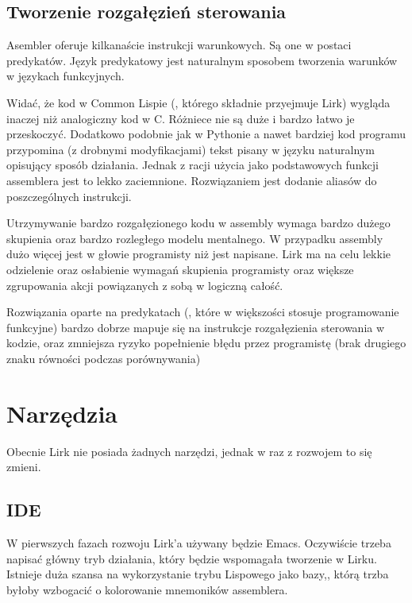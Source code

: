 \documentclass[11pt]{article}
\begin{document}
\subsection{Tworzenie rozgałęzień sterowania}
Asembler oferuje kilkanaście instrukcji warunkowych. Są one w postaci predykatów. Język predykatowy jest naturalnym sposobem tworzenia warunków w językach funkcyjnych. 

\begin{multicols}{3}

\columnbreak

\columnbreak

\end{multicols}

Widać, że kod w Common Lispie (, którego składnie przyejmuje Lirk) wygląda inaczej niż analogiczny kod w C. Różniece nie są duże i bardzo łatwo je przeskoczyć. Dodatkowo podobnie jak w Pythonie a nawet bardziej kod programu przypomina (z drobnymi modyfikacjami) tekst pisany w języku naturalnym opisujący sposób działania. Jednak z racji użycia jako podstawowych funkcji assemblera jest to lekko zaciemnione. Rozwiązaniem jest dodanie aliasów do poszczególnych instrukcji. 

Utrzymywanie bardzo rozgałęzionego kodu w assembly wymaga bardzo dużego skupienia oraz bardzo rozległego modelu mentalnego. W przypadku assembly dużo więcej jest w głowie programisty niż jest napisane.
Lirk ma na celu lekkie odzielenie oraz osłabienie wymagań skupienia programisty oraz większe zgrupowania akcji powiązanych z sobą w logiczną całość.

Rozwiązania oparte na predykatach (, które w większości stosuje programowanie funkcyjne) bardzo dobrze mapuje się na instrukcje rozgałęzienia sterowania w kodzie,
oraz zmniejsza ryzyko popełnienie błędu przez programistę (brak drugiego znaku równości podczas porównywania)

\section{Narzędzia}
Obecnie Lirk nie posiada żadnych narzędzi, jednak w raz z rozwojem to się zmieni.
\subsection{IDE}
W pierwszych fazach rozwoju Lirk'a używany będzie Emacs. 
Oczywiście trzeba napisać główny tryb działania,  który będzie wspomagała tworzenie w Lirku. Istnieje duża szansa na wykorzystanie trybu Lispowego jako bazy,,  którą trzba byłoby wzbogacić o kolorowanie mnemoników assemblera.
\end{document}
